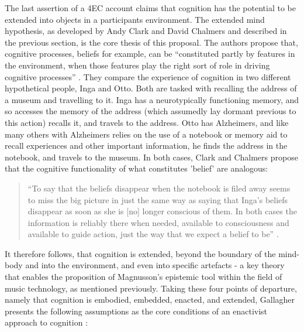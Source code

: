 The last assertion of a 4EC account claims that cognition has the potential to be extended into objects in a participants environment. The extended mind hypothesis, as developed by Andy Clark and David Chalmers and described in the previous section, is the core thesis of this proposal. The authors propose that, cognitive processes, beliefs for example, can be “constituted partly by features in the environment, when those features play the right sort of role in driving cognitive processes” \citeyearpar[p. 12]{clark1998}. They compare the experience of cognition in two different hypothetical people, Inga and Otto. Both are tasked with recalling the address of a museum and travelling to it. Inga has a neurotypically functioning memory, and so accesses the memory of the address (which assumedly lay dormant previous to this action) recalls it, and travels to the address. Otto has Alzheimers, and like many others with Alzheimers relies on the use of a notebook or memory aid to recall experiences and other important information, he finds the address in the notebook, and travels to the museum. In both cases, Clark and Chalmers propose that the cognitive functionality of what constitutes ’belief’ are analogous:
\begin{quote}
    “To say that the beliefs disappear when the notebook is filed away seems to miss the big picture in just the same way as saying that Inga’s beliefs disappear as soon as she is [no] longer conscious of them. In both cases the information is reliably there when needed, available to consciousness and available to guide action, just the way that we expect a belief to be” \citeyearpar[13]{clark1998}.
\end{quote}
It therefore follows, that cognition is extended, beyond the boundary of the mind-body and into the environment, and even into specific artefacts - a key theory that enables the proposition of Magnusson’s epistemic tool within the field of music technology, as mentioned previously. Taking these four points of departure, namely that cognition is embodied, embedded, enacted, and extended, Gallagher presents the following assumptions as the core conditions of an enactivist approach to cognition \citep[p. 6]{gallagher2017}:
